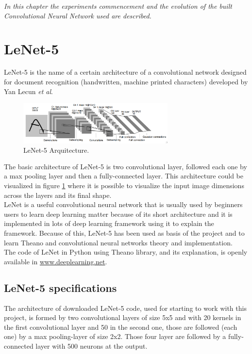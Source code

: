
\begin{small}
\emph{In this chapter the experiments commencement
 and the evolution of the built Convolutional Neural Network used are described.\\}
\end{small}

\section{LeNet-5}
LeNet-5 \cite{Lenet5} is the name of a certain architecture of a convolutional network designed for document recognition (handwritten, machine printed characters) developed by Yan Lecun \textit{et al}.\\

\begin{figure}[htb]
  \centering
  \includegraphics[width=0.7\textwidth]{images/images_lenet/LenetArquitectura.png}
  \caption{LeNet-5 Arquitecture.}
  \label{Lenet5Arquitectura}
\end{figure}

The basic architecture of LeNet-5 is two convolutional layer, followed each one by a max pooling layer and then a fully-connected layer. This architecture could be visualized in figure \ref{Lenet5Arquitectura} where it is possible to visualize the input image dimensions across the layers and its final shape.\\

LeNet is a useful convolutional neural network that is usually used by beginners users to learn deep learning matter because of its short architecture and it is implemented in lots of deep learning framework using it to explain the framework. Because of this, LeNet-5 has been used as basis of the project and to learn Theano and convolutional neural networks theory and implementation.\\

The code of LeNet in Python using Theano library, and its explanation, is openly available in \url{www.deeplearning.net}.\\

\subsection{LeNet-5 specifications}
The architecture of downloaded LeNet-5 code, used for starting to work with this project, is formed by two convolutional layers of size 5x5 and with 20 kernels in the first convolutional layer and 50 in the second one, those are followed (each one) by a max pooling-layer of size 2x2. Those four layer are followed by a fully-connected layer with 500 neurons at the output.\\

